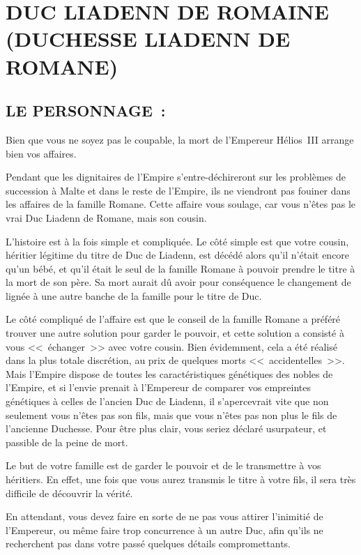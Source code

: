 \documentclass[14pt,twocolumn]{extarticle}
\begin{document}
\section{DUC LIADENN DE ROMAINE\\(DUCHESSE LIADENN DE ROMANE)}

\subsection{LE PERSONNAGE~:}

Bien que vous ne soyez pas le coupable, la mort de l'Empereur Hélios~III
arrange bien vos affaires.

Pendant que les dignitaires de l'Empire s'entre-déchireront sur les problèmes
de succession à Malte et dans le reste de l'Empire, ils ne viendront pas
fouiner dans les affaires de la famille Romane. Cette affaire vous soulage, car
vous n'êtes pas le vrai Duc Liadenn de Romane, mais son cousin.

L'histoire est à la fois simple et compliquée. Le côté simple est que votre
cousin, héritier légitime du titre de Duc de Liadenn, est décédé alors qu'il
n'était encore qu'un bébé, et qu'il était le seul de la famille Romane à
pouvoir prendre le titre à la mort de son père. Sa mort aurait dû avoir pour
conséquence le changement de lignée à une autre banche de la famille pour le
titre de Duc.

Le côté compliqué de l'affaire est que le conseil de la famille Romane a
préféré trouver une autre solution pour garder le pouvoir, et cette solution a
consisté à vous <<~échanger~>> avec votre cousin. Bien évidemment, cela a été
réalisé dans la plus totale discrétion, au prix de quelques morts
<<~accidentelles~>>. Mais l'Empire dispose de toutes les caractéristiques
génétiques des nobles de l'Empire, et si l'envie prenait à l'Empereur de
comparer vos empreintes génétiques à celles de l'ancien Duc de Liadenn, il
s'apercevrait vite que non seulement vous n'êtes pas son fils, mais que vous
n'êtes pas non plus le fils de l'ancienne Duchesse. Pour être plus clair, vous
seriez déclaré usurpateur, et passible de la peine de mort.

Le but de votre famille est de garder le pouvoir et de le transmettre à vos
héritiers. En effet, une fois que vous aurez transmis le titre à votre fils, il
sera très difficile de découvrir la vérité.

En attendant, vous devez faire en sorte de ne pas vous attirer l'inimitié de
l'Empereur, ou même faire trop concurrence à un autre Duc, afin qu'ils ne
recherchent pas dans votre passé quelques détails compromettants.
\end{document}
